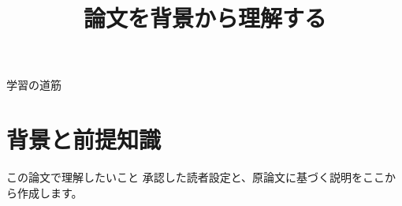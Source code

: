 \documentclass[aspectratio=169,professionalfonts,11pt]{beamer}
\title{論文を背景から理解する}
\author{}
\date{}
\begin{document}
\begin{frame}\titlepage\end{frame}
\begin{frame}{学習の道筋}\tableofcontents\end{frame}
\section{背景と前提知識}
\begin{frame}{この論文で理解したいこと}
承認した読者設定と、原論文に基づく説明をここから作成します。
\end{frame}
\end{document}
